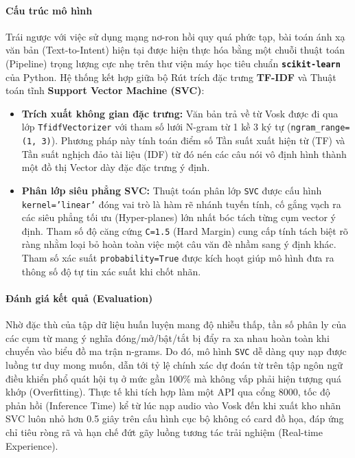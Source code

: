 \paragraph{Cấu trúc mô hình}
Trái ngược với việc sử dụng mạng nơ-ron hồi quy quá phức tạp, bài toán ánh xạ văn bản (Text-to-Intent) hiện tại được hiện thực hóa bằng một chuỗi thuật toán (Pipeline) trọng lượng cực nhẹ trên thư viện máy học tiêu chuẩn \textbf{\texttt{scikit-learn}} của Python. Hệ thống kết hợp giữa bộ Rút trích đặc trưng \textbf{TF-IDF} và Thuật toán tĩnh \textbf{Support Vector Machine (SVC)}:
\begin{itemize}
    \item \textbf{Trích xuất không gian đặc trưng:} Văn bản trả về từ Vosk được đi qua lớp \texttt{TfidfVectorizer} với tham số lưới N-gram từ 1 kề 3 ký tự (\texttt{ngram\_range=(1, 3)}). Phương pháp này tính toán điểm số Tần suất xuất hiện từ (TF) và Tần suất nghịch đảo tài liệu (IDF) từ đó nén các câu nói vô định hình thành một đồ thị Vector dày đặc đặc trưng ý định.
    \item \textbf{Phân lớp siêu phẳng SVC:} Thuật toán phân lớp \texttt{SVC} được cấu hình \texttt{kernel='linear'} đóng vai trò là hàm rẽ nhánh tuyến tính, cố gắng vạch ra các siêu phẳng tối ưu (Hyper-planes) lớn nhất bóc tách từng cụm vector ý định. Tham số độ căng cứng \texttt{C=1.5} (Hard Margin) cung cấp tính tách biệt rõ ràng nhằm loại bỏ hoàn toàn việc một câu văn đè nhầm sang ý định khác. Tham số xác suất \texttt{probability=True} được kích hoạt giúp mô hình đưa ra thông số độ tự tin xác suất khi chốt nhãn.
\end{itemize}

\paragraph{Đánh giá kết quả (Evaluation)}
Nhờ đặc thù của tập dữ liệu huấn luyện mang độ nhiễu thấp, tần số phân ly của các cụm từ mang ý nghĩa đóng/mở/bật/tắt bị đẩy ra xa nhau hoàn toàn khi chuyển vào biểu đồ ma trận n-grams. Do đó, mô hình \texttt{SVC} dễ dàng quy nạp được luồng tư duy mong muốn, dẫn tới tỷ lệ chính xác dự đoán từ trên tập ngôn ngữ điều khiển phổ quát hội tụ ở mức gần 100\% mà không vấp phải hiện tượng quá khớp (Overfitting). 
Thực tế khi tích hợp làm một API qua cổng 8000, tốc độ phản hồi (Inference Time) kể từ lúc nạp audio vào Vosk đến khi xuất kho nhãn SVC luôn nhỏ hơn 0.5 giây trên cấu hình cục bộ không có card đồ họa, đáp ứng chỉ tiêu ròng rã và hạn chế đứt gãy luồng tương tác trải nghiệm (Real-time Experience).

